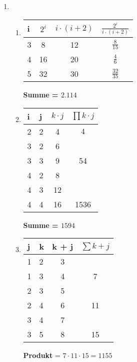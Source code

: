 \documentclass[a4paper]{article}
\begin{document}
	\begin{enumerate}
		\item
		\begin{enumerate}
			\item
			\begin{center}
				\begin{tabular}{|l|c|c|c|}
					\firsthline
						i & $2^{i}$ & $i \cdot (i + 2)$ & $\frac{2^{i}}{i \cdot (i + 2)}$ \\
					\hline
						3 & 8 & 12 & $\frac{8}{15}$ \\
						4 & 16 & 20 & $\frac{4}{6}$ \\
						5 & 32 & 30 & $\frac{32}{35}$ \\
					\hline
				\end{tabular}
				\newline
				\textbf{Summe = $2.114$}
			\end{center}
			
			\item
			\begin{center}
				\begin{tabular}{|l|l|c|c|}
					\firsthline
						i & j & $k \cdot j$ & $\displaystyle\prod k \cdot j$ \\
					\hline
						2 & 2 & 4 & $4$ \\
						3 & 2 & 6 &  \\
						3 & 3 & 9 & 54 \\
						4 & 2 & 8 &  \\
						4 & 3 & 12 &  \\
						4 & 4 & 16 & 1536 \\
					\hline
				\end{tabular}
				\newline
				\textbf{Summe = $1594$}
			\end{center}
			
			\item
			\begin{center}
				\begin{tabular}{|l|l|c|c|}
					\firsthline
						j & k & k + j & $\displaystyle\sum k + j$ \\
					\hline
						1 & 2 & 3 &  \\
						1 & 3 & 4 & 7 \\
						2 & 3 & 5 &  \\
						2 & 4 & 6 & 11 \\
						3 & 4 & 7 &  \\
						3 & 5 & 8 & 15 \\
					\hline
				\end{tabular}
				\newline
				\textbf{Produkt} = $7 \cdot 11 \cdot 15 = 1155$
			\end{center}
		\end{enumerate}
		

\end{enumerate}
\end{document}
